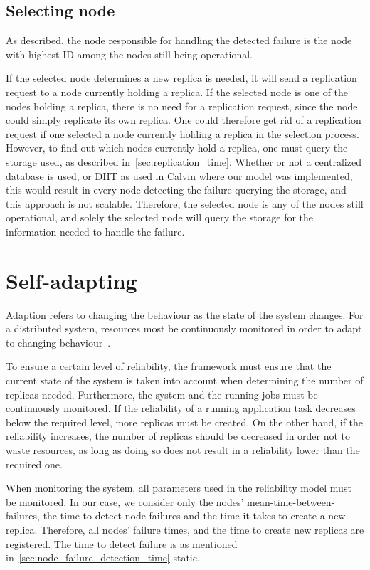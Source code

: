 \documentclass{cslthse-msc}
\begin{document}
\subsection{Selecting node}
As described, the node responsible for handling the detected failure is the node with highest ID among the nodes still being operational.

If the selected node determines a new replica is needed, it will send a replication request to a node currently holding a replica. If the selected node is one of the nodes holding a replica, there is no need for a replication request, since the node could simply replicate its own replica. One could therefore get rid of a replication request if one selected a node currently holding a replica in the selection process. However, to find out which nodes currently hold a replica, one must query the storage used, as described in~\cref{sec:replication_time}. Whether or not a centralized database is used, or DHT as used in Calvin where our model was implemented, this would result in every node detecting the failure querying the storage, and this approach is not scalable. Therefore, the selected node is any of the nodes still operational, and solely the selected node will query the storage for the information needed to handle the failure.

\section{Self-adapting} \label{sec:design_self_adapting}
Adaption refers to changing the behaviour as the state of the system changes. For a distributed system, resources most be continuously monitored in order to adapt to changing behaviour~\cite{imprRelAdaptRL}.

To ensure a certain level of reliability, the framework must ensure that the current state of the system is taken into account when determining the number of replicas needed. Furthermore, the system and the running jobs must be continuously monitored. If the reliability of a running application task decreases below the required level, more replicas must be created. On the other hand, if the reliability increases, the number of replicas should be decreased in order not to waste resources, as long as doing so does not result in a reliability lower than the required one.

When monitoring the system, all parameters used in the reliability model must be monitored. In our case, we consider only the nodes' mean-time-between-failures, the time to detect node failures and the time it takes to create a new replica. Therefore, all nodes' failure times, and the time to create new replicas are registered. The time to detect failure is as mentioned in~\cref{sec:node_failure_detection_time} static.
\end{document}

